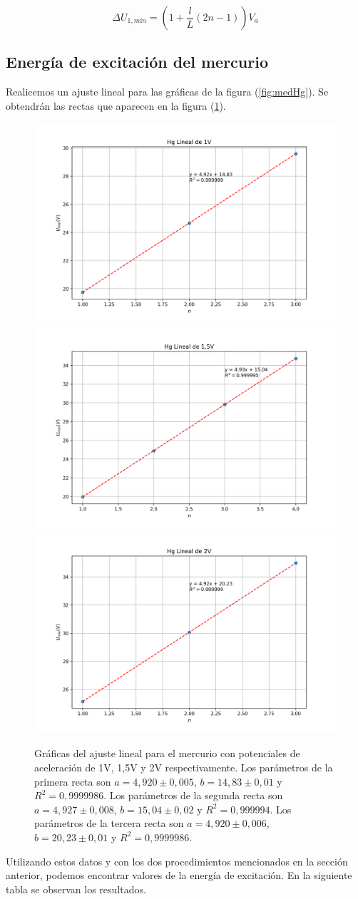 \documentclass{article}
\begin{document}
\begin{equation}
\Delta U_{1, mín} = \left( 1 + \frac{l}{L}(2n - 1) \right) V_a
\end{equation}

\subsection{Energía de excitación del mercurio}

Realicemos un ajuste lineal para las gráficas de la figura (\ref{fig:medHg}). Se obtendrán las rectas que aparecen en la figura (\ref{fig:recHg}).

\begin{figure}[h!]
\begin{center}
\includegraphics[max width=0.32\linewidth]{Hg Lineal de 1V}
\includegraphics[max width=0.32\linewidth]{Hg Lineal de 1,5V}
\includegraphics[max width=0.32\linewidth]{Hg Lineal de 2V}
\caption{Gráficas del ajuste lineal para el mercurio con potenciales de aceleración de 1V, 1,5V y 2V respectivamente. Los parámetros de la primera recta son $a = 4,920 \pm 0,005$, $b = 14,83 \pm 0,01$ y $R^2 = 0,9999986$. Los parámetros de la segunda recta son $a = 4,927 \pm 0,008$, $b = 15,04 \pm 0,02$ y $R^2 = 0,999994$. Los parámetros de la tercera recta son $a = 4,920 \pm 0,006$, $b = 20,23 \pm 0,01$ y $R^2 = 0,9999986$.}
\label{fig:recHg}
\end{center}
\end{figure}

Utilizando estos datos y con los dos procedimientos mencionados en la sección anterior, podemos encontrar valores de la energía de excitación. En la siguiente tabla se observan los resultados.
\end{document}
